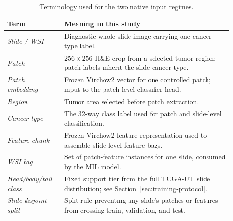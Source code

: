 \documentclass[11pt]{article}
\begin{document}
\begin{table}[ht]
  \centering
  \caption{Terminology used for the two native input regimes.}
  \label{tab:dataset-terminology}
  \small
  \begin{tabular}{p{0.23\linewidth}p{0.68\linewidth}}
    \toprule
    Term & Meaning in this study\\
    \midrule
    \emph{Slide / WSI} & Diagnostic whole-slide image carrying one cancer-type label.\\
    \emph{Patch} & $256\times256$ H\&E crop from a selected tumor region; patch labels inherit the slide cancer type.\\
    \emph{Patch embedding} & Frozen Virchow2 vector for one controlled patch; input to the patch-level classifier head.\\
    \emph{Region} & Tumor area selected before patch extraction.\\
    \emph{Cancer type} & The 32-way class label used for patch and slide-level classification.\\
    \emph{Feature chunk} & Frozen Virchow2 feature representation used to assemble slide-level feature bags.\\
    \emph{WSI bag} & Set of patch-feature instances for one slide, consumed by the MIL model.\\
    \emph{Head/body/tail class} & Fixed support tier from the full TCGA-UT slide distribution; see Section~\ref{sec:training-protocol}.\\
    \emph{Slide-disjoint split} & Split rule preventing any slide's patches or features from crossing train, validation, and test.\\
    \bottomrule
  \end{tabular}
\end{table}
\end{document}
